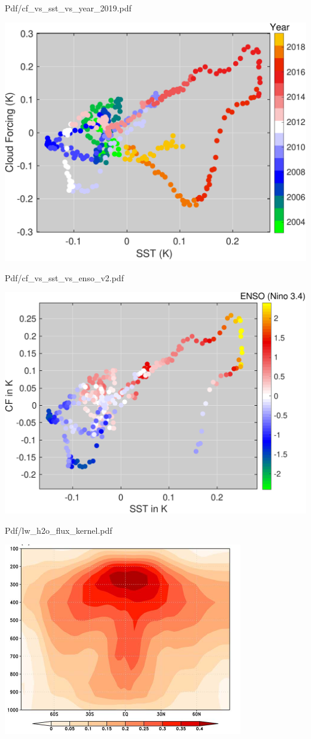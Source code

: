\documentclass[10pt,t]{beamer}
\begin{document}
\begin{frame}[label={sec:orgfb11446}]{Pdf/cf\_vs\_sst\_vs\_year\_2019.pdf}
\begin{center}
\includegraphics[width=0.7\linewidth]{./Figs/Pdf/cf_vs_sst_vs_year_2019.pdf}
\end{center}
\end{frame}

\begin{frame}[label={sec:org14249b8}]{Pdf/cf\_vs\_sst\_vs\_enso\_v2.pdf}
\begin{center}
\includegraphics[width=0.7\linewidth]{./Figs/Pdf/cf_vs_sst_vs_enso_v2.pdf}
\end{center}
\end{frame}

\begin{frame}[label={sec:org356c368}]{Pdf/lw\_h2o\_flux\_kernel.pdf}
\begin{center}
\includegraphics[width=0.7\linewidth]{./Figs/Pdf/lw_h2o_flux_kernel.pdf}
\end{center}
\end{frame}
\end{document}
